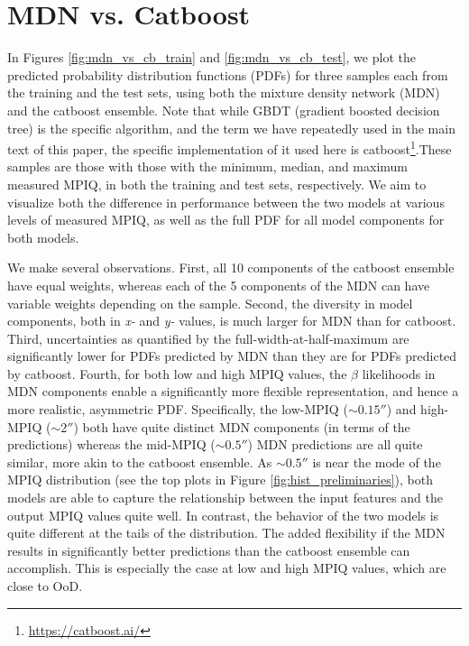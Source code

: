 \section{MDN vs. Catboost} \label{sec:app_mdnvscatboost}

In Figures \ref{fig:mdn_vs_cb_train} and \ref{fig:mdn_vs_cb_test}, we plot the predicted probability distribution functions (PDFs) for three samples each from the training and the test sets, using both the mixture density network (MDN) and the {\sc catboost} ensemble. Note that while GBDT (gradient boosted decision tree) is the specific algorithm, and the term we have repeatedly used in the main text of this paper, the specific implementation of it used here is {\sc catboost}\footnote{\url{https://catboost.ai/}}.These samples are those with those with the minimum, median, and maximum measured MPIQ, in both the training and test sets, respectively. We aim to visualize both the difference in performance between the two models at various levels of measured MPIQ, as well as the full PDF for all model components for both models.

We make several observations. First, all 10 components of the {\sc catboost} ensemble have equal weights, whereas each of the 5 components of the MDN can have variable weights depending on the sample. Second, the diversity in model components, both in \textit{x-} and \textit{y-} values, is much larger for MDN than for {\sc catboost}. Third, uncertainties as quantified by the full-width-at-half-maximum are significantly lower for PDFs predicted by MDN than they are for PDFs predicted by {\sc catboost}. Fourth, for both low and high MPIQ values, the $\beta$ likelihoods in MDN components enable a significantly more flexible representation, and hence a more realistic, asymmetric PDF. Specifically, the low-MPIQ ($\sim0.15''$) and high-MPIQ ($\sim2''$) both have quite distinct MDN components (in terms of the predictions) whereas the mid-MPIQ ($\sim0.5''$) MDN predictions are all quite similar, more akin to the {\sc catboost} ensemble. As $\sim0.5''$ is near the mode of the MPIQ distribution (see the top plots in Figure \ref{fig:hist_preliminaries}),  both models are able to capture the relationship between the input features and the output MPIQ values quite well.  In contrast, the behavior of the two models is quite different at the tails of the distribution. The added flexibility if the MDN results in significantly better predictions than the {\sc catboost} ensemble can accomplish.  This is especially the case at low and high MPIQ values, which are close to OoD.

